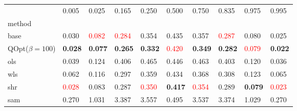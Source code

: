 \begin{tabular}{llllllllll}
\toprule
 & 0.005 & 0.025 & 0.165 & 0.250 & 0.500 & 0.750 & 0.835 & 0.975 & 0.995 \\
method &  &  &  &  &  &  &  &  &  \\
\midrule
base & 0.030 & \textcolor{red}{0.082} & \textcolor{red}{0.284} & 0.354 & 0.435 & 0.357 & \textcolor{red}{0.287} & 0.080 & 0.025 \\
\midrule
QOpt($\beta=100$) & \textbf{0.028} & \textbf{0.077} & \textbf{0.265} & \textbf{0.332} & \textcolor{red}{0.420} & \textbf{0.349} & \textbf{0.282} & \textcolor{red}{0.079} & \textbf{0.022} \\
ols & 0.039 & 0.124 & 0.406 & 0.465 & 0.446 & 0.463 & 0.403 & 0.120 & 0.036 \\
wls & 0.062 & 0.116 & 0.297 & 0.359 & 0.434 & 0.368 & 0.308 & 0.123 & 0.065 \\
shr & \textcolor{red}{0.028} & 0.083 & 0.287 & \textcolor{red}{0.350} & \textbf{0.417} & \textcolor{red}{0.354} & 0.289 & \textbf{0.079} & \textcolor{red}{0.023} \\
sam & 0.270 & 1.031 & 3.387 & 3.557 & 0.495 & 3.537 & 3.374 & 1.029 & 0.270 \\
\bottomrule
\end{tabular}